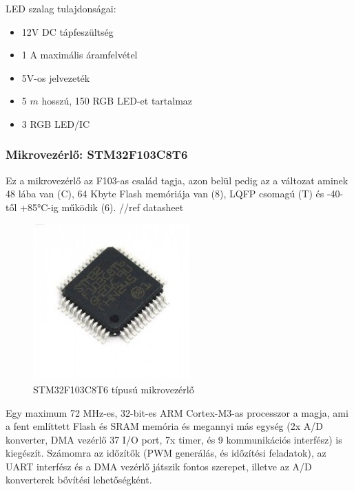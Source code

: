 \documentclass[../main.tex]{subfiles}
\begin{document}
            LED szalag tulajdonságai:
            \begin{itemize}
                \item 12V DC tápfeszültség
                \item 1 A maximális áramfelvétel
                \item 5V-os jelvezeték
                \item 5 $m$ hosszú, 150 RGB LED-et tartalmaz
                \item 3 RGB LED/IC
            \end{itemize}
            
        \subsubsection{Mikrovezérlő: STM32F103C8T6}
            Ez a mikrovezérlő az F103-as család tagja, azon belül pedig az a változat aminek 48 lába van (C), 64 Kbyte Flash memóriája van (8), LQFP csomagú (T) és -40-től +85°C-ig működik (6). //ref datasheet
            
            \begin{figure}[h!] %
                \centering
                    \includegraphics[width=6cm]{resources/pcb_res/stm32f103c8t6.jpg}
                \caption{STM32F103C8T6 típusú mikrovezérlő}
                \label{fig:stm32f103_ic}
            \end{figure}
            
            Egy maximum 72 MHz-es, 32-bit-es ARM Cortex-M3-as processzor a magja, ami a fent említtett Flash és SRAM memória és megannyi más egység (2x A/D konverter, DMA vezérlő 37 I/O port, 7x timer, és 9 kommunikációs interfész) is kiegészít. Számomra az időzítők (PWM generálás, és időzítési feladatok), az UART interfész és a DMA vezérlő játszik fontos szerepet, illetve az A/D konverterek bővítési lehetőségként.
            
\end{document}
